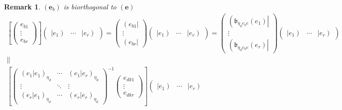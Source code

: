 \documentclass[aps,preprint]{revtex4}
\newtheorem{remark}[theorem]{Remark}
\begin{document}
\begin{remark}
$\left( \boldsymbol{e}_{b}\right) $ is biorthogonal to $\left( \boldsymbol{e}%
\right) $ 
\begin{gather}
\left[ \left( 
\begin{array}{c}
e_{b1} \\ 
\vdots \\ 
e_{br}%
\end{array}%
\right) \right] \left( 
\begin{array}{ccc}
\left\vert e_{1}\right) & \cdots & \left\vert e_{r}\right)%
\end{array}%
\right) =\left( 
\begin{array}{c}
\left( e_{b1}\right\vert \\ 
\vdots \\ 
\left( e_{br}\right\vert%
\end{array}%
\right) \left( 
\begin{array}{ccc}
\left\vert e_{1}\right) & \cdots & \left\vert e_{r}\right)%
\end{array}%
\right) =\left( 
\begin{array}{c}
\left( \mathfrak{b}_{\eta _{d}e_{b}e}\left( e_{1}\right) \right\vert \\ 
\vdots \\ 
\left( \mathfrak{b}_{\eta _{d}e_{b}e}\left( e_{r}\right) \right\vert%
\end{array}%
\right) \left( 
\begin{array}{ccc}
\left\vert e_{1}\right) & \cdots & \left\vert e_{r}\right)%
\end{array}%
\right) \\
\parallel \\
\left[ \left( 
\begin{array}{ccc}
\left( \left. e_{1}\right\vert e_{1}\right) _{\eta _{d}} & \cdots & \left(
\left. e_{1}\right\vert e_{r}\right) _{\eta _{d}} \\ 
\vdots & \ddots & \vdots \\ 
\left( \left. e_{r}\right\vert e_{1}\right) _{\eta _{d}} & \cdots & \left(
\left. e_{r}\right\vert e_{r}\right) _{\eta _{d}}%
\end{array}%
\right) ^{-1}\left( 
\begin{array}{c}
e_{dk1} \\ 
\vdots \\ 
e_{dkr}%
\end{array}%
\right) \right] \left( 
\begin{array}{ccc}
\left\vert e_{1}\right) & \cdots & \left\vert e_{r}\right)%

\end{array}
\end{gather}
\end{remark}
\end{document}
